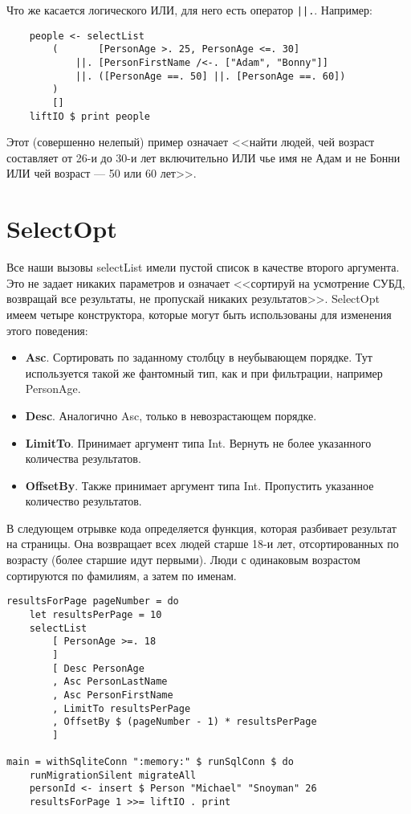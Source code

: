 Что же касается логического ИЛИ, для него есть оператор \lstinline'||.'. Например:

\begin{lstlisting}
    people <- selectList
        (       [PersonAge >. 25, PersonAge <=. 30]
            ||. [PersonFirstName /<-. ["Adam", "Bonny"]]
            ||. ([PersonAge ==. 50] ||. [PersonAge ==. 60])
        )
        []
    liftIO $ print people
\end{lstlisting}%

Этот (совершенно нелепый) пример означает <<найти людей, чей возраст составляет от 26-и до 30-и лет включительно ИЛИ чье имя не Адам и не Бонни ИЛИ чей возраст --- 50 или 60 лет>>.

\section{SelectOpt}

Все наши вызовы selectList имели пустой список в качестве второго аргумента. Это не задает никаких параметров и означает <<сортируй на усмотрение СУБД, возвращай все результаты, не пропускай никаких результатов>>. SelectOpt имеем четыре конструктора, которые могут быть использованы для изменения этого поведения:

\begin{itemize}
\item {\bf Asc}. Сортировать по заданному столбцу в неубывающем порядке. Тут используется такой же фантомный тип, как и при фильтрации, например PersonAge.
\item {\bf Desc}. Аналогично Asc, только в невозрастающем порядке.
\item {\bf LimitTo}. Принимает аргумент типа Int. Вернуть не более указанного количества результатов.
\item {\bf OffsetBy}. Также принимает аргумент типа Int. Пропустить указанное количество результатов.
\end{itemize}

В следующем отрывке кода определяется функция, которая разбивает результат на страницы. Она возвращает всех людей старше 18-и лет, отсортированных по возрасту (более старшие идут первыми). Люди с одинаковым возрастом сортируются по фамилиям, а затем по именам.

\begin{lstlisting}
resultsForPage pageNumber = do
    let resultsPerPage = 10
    selectList
        [ PersonAge >=. 18
        ]
        [ Desc PersonAge
        , Asc PersonLastName
        , Asc PersonFirstName
        , LimitTo resultsPerPage
        , OffsetBy $ (pageNumber - 1) * resultsPerPage
        ]

main = withSqliteConn ":memory:" $ runSqlConn $ do
    runMigrationSilent migrateAll
    personId <- insert $ Person "Michael" "Snoyman" 26
    resultsForPage 1 >>= liftIO . print
\end{lstlisting}%


